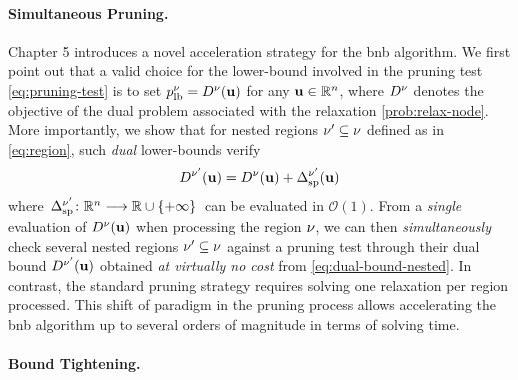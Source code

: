 \documentclass[11pt]{article}
\begin{document}
\paragraph{Simultaneous Pruning.}

Chapter 5 introduces a novel acceleration strategy for the \gls{bnb} algorithm.
We first point out that a valid choice for the lower-bound involved in the pruning test \eqref{eq:pruning-test} is to set $p_{\text{lb}}^\nu = D^\nu(\mathbf{u})$ for any $\dv \in \kR^{\pdim}$, where $D^\nu$ denotes the objective of the dual problem associated with the relaxation \eqref{prob:relax-node}.
More importantly, we show that for nested regions $\nu' \subseteq \nu$ defined as in \eqref{eq:region}, such \emph{dual} lower-bounds verify
\begin{equation}
    \label{eq:dual-bound-nested}
    D^{\nu'}(\mathbf{u}) = D^\nu(\mathbf{u}) + \Delta_{\text{sp}}^{\nu'}(\mathbf{u})
\end{equation}
where $\kfuncdef{\Delta_{\text{sp}}^{\nodesymbol'}}{\kR^{\pdim}}{\kR \cup \{+\infty\}}$ can be evaluated in $\mathcal{O}(1)$.
From a \emph{single} evaluation of $D^\nu(\mathbf{u})$ when processing the region $\nu$, we can then \emph{simultaneously} check several nested regions $\nu' \subseteq \nu$ against a pruning test through their dual bound $D^{\nu'}(\mathbf{u})$ obtained \emph{at virtually no cost} from \eqref{eq:dual-bound-nested}.
In contrast, the standard pruning strategy requires solving one relaxation per region processed.
This shift of paradigm in the pruning process allows accelerating the \gls{bnb} algorithm up to several orders of magnitude in terms of solving time.

\paragraph{Bound Tightening.}
\end{document}
